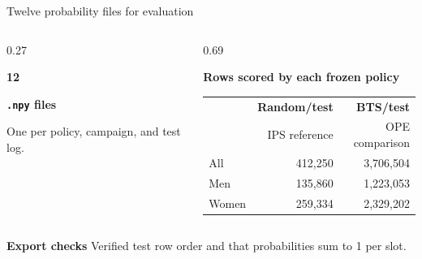 \documentclass[aspectratio=169,12pt]{beamer}
\begin{document}
\begin{frame}{Twelve probability files for evaluation}
\begin{columns}[c,onlytextwidth]
\begin{column}{0.27\textwidth}
{\LARGE\bfseries\color{navy}12\par}
\vspace{1mm}
{\small\bfseries \texttt{.npy} files\par}
\vspace{2mm}
{\small One per policy, campaign, and test log.\par}
\end{column}
\begin{column}{0.69\textwidth}
{\small\bfseries\color{navy} Rows scored by each frozen policy\par}
\vspace{3mm}
{\small
\renewcommand{\arraystretch}{1.3}
\setlength{\tabcolsep}{0.8em}
\begin{tabular}{@{}lrr@{}}
\toprule
 & \textbf{Random/test} & \textbf{BTS/test} \\
 & \footnotesize IPS reference & \footnotesize OPE comparison \\
\midrule
All & 412,250 & 3,706,504 \\
Men & 135,860 & 1,223,053 \\
Women & 259,334 & 2,329,202 \\
\bottomrule
\end{tabular}\par}
\end{column}
\end{columns}
\vspace{5mm}
{\small\color{navy}
\textbf{Export checks} \quad Verified test row order and that probabilities sum to 1 per slot.\par}
\end{frame}
\end{document}
